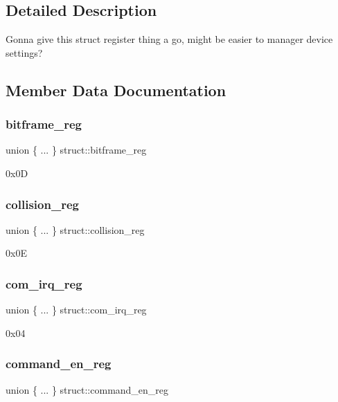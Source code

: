 \subsection{Detailed Description}
Gonna give this struct register thing a go, might be easier to manager device settings? 

\subsection{Member Data Documentation}
\mbox{\label{structstruct_a875453616cf061da36e0ed90d46d380c}} 
\subsubsection{\texorpdfstring{bitframe\+\_\+reg}{bitframe\_reg}}
{\footnotesize\ttfamily union \{ ... \}   struct\+::bitframe\+\_\+reg}

0x0D \mbox{\label{structstruct_ac0256f75f90f8e0587b10bd273eb127e}} 
\subsubsection{\texorpdfstring{collision\+\_\+reg}{collision\_reg}}
{\footnotesize\ttfamily union \{ ... \}   struct\+::collision\+\_\+reg}

0x0E \mbox{\label{structstruct_a2732e86723cc2f90559edb4721ccb79a}} 
\subsubsection{\texorpdfstring{com\+\_\+irq\+\_\+reg}{com\_irq\_reg}}
{\footnotesize\ttfamily union \{ ... \}   struct\+::com\+\_\+irq\+\_\+reg}

0x04 \mbox{\label{structstruct_aaaae33aa946f3e8116c2c852830d8291}} 
\subsubsection{\texorpdfstring{command\+\_\+en\+\_\+reg}{command\_en\_reg}}
{\footnotesize\ttfamily union \{ ... \}   struct\+::command\+\_\+en\+\_\+reg}


